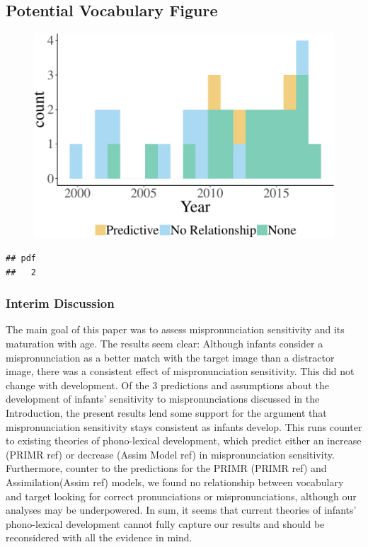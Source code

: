 \documentclass[man]{apa6}
\theoremstyle{definition}
\theoremstyle{definition}
\theoremstyle{definition}
\theoremstyle{remark}
\begin{document}
\subsection{Potential Vocabulary
Figure}\label{potential-vocabulary-figure}

\begin{figure}
\centering
\includegraphics{Paper_Analyses_files/figure-latex/Vocab_describe1-1.pdf}
\caption{}
\end{figure}

\begin{verbatim}
## pdf 
##   2
\end{verbatim}

\subsubsection{Interim Discussion}\label{interim-discussion}

The main goal of this paper was to assess mispronunciation sensitivity
and its maturation with age. The results seem clear: Although infants
consider a mispronunciation as a better match with the target image than
a distractor image, there was a consistent effect of mispronunciation
sensitivity. This did not change with development. Of the 3 predictions
and assumptions about the development of infants' sensitivity to
mispronunciations discussed in the Introduction, the present results
lend some support for the argument that mispronunciation sensitivity
stays consistent as infants develop. This runs counter to existing
theories of phono-lexical development, which predict either an increase
(PRIMR ref) or decrease (Assim Model ref) in mispronunciation
sensitivity. Furthermore, counter to the predictions for the PRIMR
(PRIMR ref) and Assimilation(Assim ref) models, we found no relationship
between vocabulary and target looking for correct pronunciations or
mispronunciations, although our analyses may be underpowered. In sum, it
seems that current theories of infants' phono-lexical development cannot
fully capture our results and should be reconsidered with all the
evidence in mind.
\end{document}
